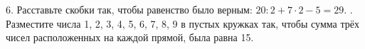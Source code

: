6. Расставьте скобки так, чтобы равенство было верным: $20:2+7\cdot2-5=29.$
\newpage
{}. Разместите числа 1, 2, 3, 4, 5, 6, 7, 8, 9 в пустых кружках так, чтобы сумма трёх чисел расположенных на каждой прямой, была равна 15.
\begin{center}
\begin{figure}[h!]
\end{figure}
\end{center}
